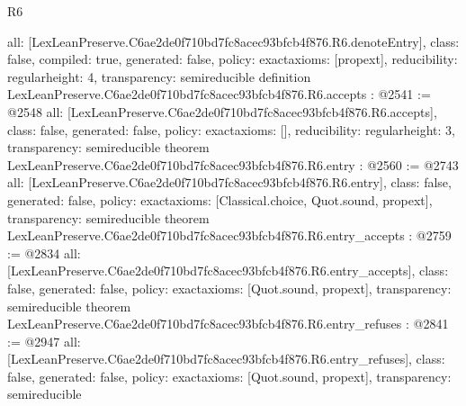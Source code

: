 \begin{lexlean}{R6}
\begin{coremodule}
{  all: [LexLeanPreserve.C6ae2de0f710bd7fc8acec93bfcb4f876.R6.denoteEntry],
  class: false,
  compiled: true,
  generated: false,
  policy: exact{axioms: [propext]},
  reducibility: regular{height: 4},
  transparency: semireducible
}
definition LexLeanPreserve.C6ae2de0f710bd7fc8acec93bfcb4f876.R6.accepts : @2541 := @2548 {
  all: [LexLeanPreserve.C6ae2de0f710bd7fc8acec93bfcb4f876.R6.accepts],
  class: false,
  generated: false,
  policy: exact{axioms: []},
  reducibility: regular{height: 3},
  transparency: semireducible
}
theorem LexLeanPreserve.C6ae2de0f710bd7fc8acec93bfcb4f876.R6.entry : @2560 := @2743 {
  all: [LexLeanPreserve.C6ae2de0f710bd7fc8acec93bfcb4f876.R6.entry],
  class: false,
  generated: false,
  policy: exact{axioms: [Classical.choice, Quot.sound, propext]},
  transparency: semireducible
}
theorem LexLeanPreserve.C6ae2de0f710bd7fc8acec93bfcb4f876.R6.entry_accepts : @2759 := @2834 {
  all: [LexLeanPreserve.C6ae2de0f710bd7fc8acec93bfcb4f876.R6.entry_accepts],
  class: false,
  generated: false,
  policy: exact{axioms: [Quot.sound, propext]},
  transparency: semireducible
}
theorem LexLeanPreserve.C6ae2de0f710bd7fc8acec93bfcb4f876.R6.entry_refuses : @2841 := @2947 {
  all: [LexLeanPreserve.C6ae2de0f710bd7fc8acec93bfcb4f876.R6.entry_refuses],
  class: false,
  generated: false,
  policy: exact{axioms: [Quot.sound, propext]},
  transparency: semireducible
}


\end{coremodule}
\end{lexlean}
